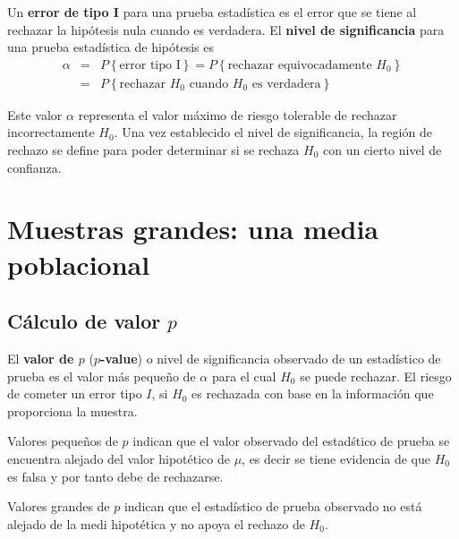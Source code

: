 \begin{Def}
Un \textbf{error de tipo I} para una prueba estad\'istica es el error que se tiene al rechazar la hip\'otesis nula cuando es verdadera. El \textbf{nivel de significancia} para una prueba estad\'istica de hip\'otesis es
\begin{eqnarray*}
\alpha&=&P\left\{\textrm{error tipo I}\right\}=P\left\{\textrm{rechazar equivocadamente }H_{0}\right\}\\
&=&P\left\{\textrm{rechazar }H_{0}\textrm{ cuando }H_{0}\textrm{ es verdadera}\right\}
\end{eqnarray*}

\end{Def}
Este valor $\alpha$ representa el valor m\'aximo de riesgo tolerable de rechazar incorrectamente $H_{0}$. Una vez establecido el nivel de significancia, la regi\'on de rechazo se define para poder determinar si se rechaza $H_{0}$ con un cierto nivel de confianza.






\section{Muestras grandes: una media poblacional}
\subsection{C\'alculo de valor $p$}






\begin{Def}
El \textbf{valor de $p$} (\textbf{$p$-value}) o nivel de significancia observado de un estad\'istico de prueba es el valor m\'as peque\~ no de $\alpha$ para el cual $H_{0}$ se puede rechazar. El riesgo de cometer un error tipo $I$, si $H_{0}$ es rechazada con base en la informaci\'on que proporciona la muestra.
\end{Def}

\begin{Note}
Valores peque\~ nos de $p$ indican 	que el valor observado del estad\'stico de prueba se encuentra alejado del valor hipot\'etico de $\mu$, es decir se tiene evidencia de que $H_{0}$ es falsa y por tanto debe de rechazarse.
\end{Note}

\begin{Note}
Valores grandes de $p$ indican que el estad\'istico de prueba observado no est\'a alejado de la medi hipot\'etica y no apoya el rechazo de $H_{0}$.
\end{Note}








